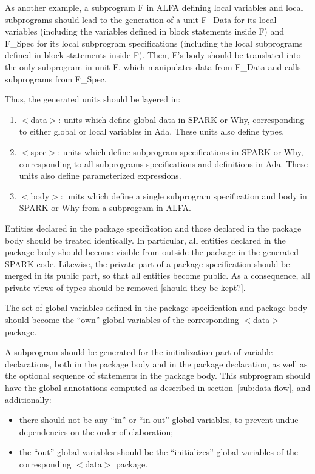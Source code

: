 \documentclass{article}
\newcounter{example}
\begin{document}
As another example, a subprogram F in ALFA defining local variables and local
subprograms should lead to the generation of a unit F\_Data for its local
variables (including the variables defined in block statements inside F) and
F\_Spec for its local subprogram specifications (including the local
subprograms defined in block statements inside F). Then, F's body should be
translated into the only subprogram in unit F, which manipulates data from
F\_Data and calls subprograms from F\_Spec.

Thus, the generated units should be layered in:
\begin{enumerate}
\item $<$data$>$: units which define global data in SPARK or Why, corresponding
  to either global or local variables in Ada. These units also define types.
\item $<$spec$>$: units which define subprogram specifications in SPARK or Why,
  corresponding to all subprograms specifications and definitions in Ada. These
  units also define parameterized expressions.
\item $<$body$>$: units which define a single subprogram specification and body
  in SPARK or Why from a subprogram in ALFA.
\end{enumerate}

Entities declared in the package specification and those declared in the
package body should be treated identically. In particular, all entities
declared in the package body should become visible from outside the package in
the generated SPARK code. Likewise, the private part of a package specification
should be merged in its public part, so that all entities become public. As a
consequence, all private views of types should be removed [should they be
kept?].

The set of global variables defined in the package specification and package
body should become the ``own'' global variables of the corresponding $<$data$>$
package.

A subprogram should be generated for the initialization part of variable
declarations, both in the package body and in the package declaration, as well
as the optional sequence of statements in the package body. This subprogram
should have the global annotations computed as described in
section~\ref{sub:data-flow}, and additionally:
\begin{itemize}
\item there should not be any ``in'' or ``in out'' global variables, to prevent
  undue dependencies on the order of elaboration;
\item the ``out'' global variables should be the ``initializes'' global
  variables of the corresponding $<$data$>$ package.
\end{itemize}
\end{document}
